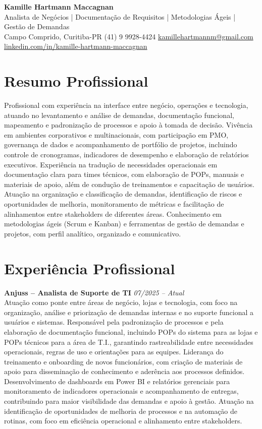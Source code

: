\documentclass[11pt,a4paper]{article}
\newcommand{\cvheader}[4]{%
  \begin{center}
    {\LARGE\bfseries #1}\\[4pt]
    {\large #2}\\[6pt]
    #3\\[2pt]
    #4
  \end{center}
  \vspace{4pt}
}
\newcommand{\experience}[3]{%
  \textbf{#1} \hfill \textit{#2}\\[4pt]
  #3
  \vspace{8pt}
}
\begin{document}
\cvheader{Kamille Hartmann Maccagnan}%
{Analista de Negócios | Documentação de Requisitos | Metodologias Ágeis | Gestão de Demandas}%
{Campo Comprido, Curitiba-PR \textbullet{} (41) 9 9928-4424 \textbullet{} \href{mailto:kamillehartmannm@gmail.com}{kamillehartmannm@gmail.com}}%
{\href{https://linkedin.com/in/kamille-hartmann-maccagnan/}{linkedin.com/in/kamille-hartmann-maccagnan}}

\section*{Resumo Profissional}

Profissional com experiência na interface entre negócio, operações e tecnologia, atuando no levantamento e análise de demandas, documentação funcional, mapeamento e padronização de processos e apoio à tomada de decisão. Vivência em ambientes corporativos e multinacionais, com participação em PMO, governança de dados e acompanhamento de portfólio de projetos, incluindo controle de cronogramas, indicadores de desempenho e elaboração de relatórios executivos. Experiência na tradução de necessidades operacionais em documentação clara para times técnicos, com elaboração de POPs, manuais e materiais de apoio, além de condução de treinamentos e capacitação de usuários. Atuação na organização e classificação de demandas, identificação de riscos e oportunidades de melhoria, monitoramento de métricas e facilitação de alinhamentos entre stakeholders de diferentes áreas. Conhecimento em metodologias ágeis (Scrum e Kanban) e ferramentas de gestão de demandas e projetos, com perfil analítico, organizado e comunicativo.

\section*{Experiência Profissional}

\experience{Anjuss -- Analista de Suporte de TI}{07/2025 -- Atual}{%
Atuação como ponte entre áreas de negócio, lojas e tecnologia, com foco na organização, análise e priorização de demandas internas e no suporte funcional a usuários e sistemas. Responsável pela padronização de processos e pela elaboração de documentação funcional, incluindo POPs do sistema para as lojas e POPs técnicos para a área de T.I., garantindo rastreabilidade entre necessidades operacionais, regras de uso e orientações para as equipes. Liderança do treinamento e onboarding de novos funcionários, com criação de materiais de apoio para disseminação de conhecimento e aderência aos processos definidos. Desenvolvimento de dashboards em Power BI e relatórios gerenciais para monitoramento de indicadores operacionais e acompanhamento de entregas, contribuindo para maior visibilidade das demandas e apoio à gestão. Atuação na identificação de oportunidades de melhoria de processos e na automação de rotinas, com foco em eficiência operacional e alinhamento entre stakeholders.}
\end{document}
